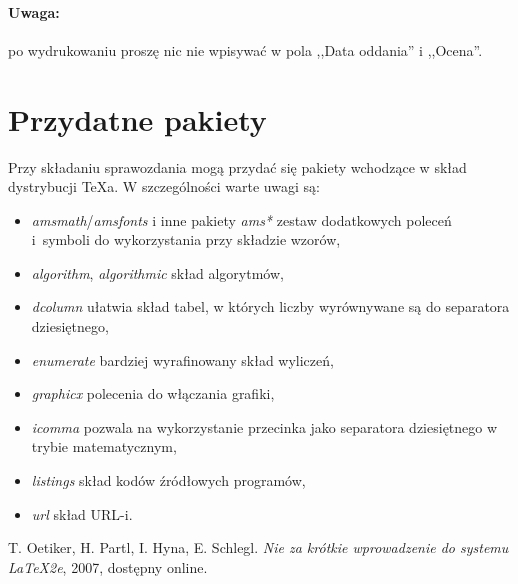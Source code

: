 \documentclass{classrep}
\begin{document}
\paragraph{Uwaga:} po wydrukowaniu proszę nic nie wpisywać w pola
,,Data oddania'' i ,,Ocena''.

\section{Przydatne pakiety}
Przy składaniu sprawozdania mogą przydać się pakiety wchodzące w
skład dystrybucji \TeX\dywiz a. W szczególności warte uwagi są:
\begin{itemize}
  \item \emph{amsmath}/\emph{amsfonts} i inne pakiety \emph{ams*} \ppauza
    zestaw dodatkowych poleceń i~symboli do wykorzystania przy składzie
    wzorów,
  \item \emph{algorithm}, \emph{algorithmic} \ppauza skład algorytmów,
  \item \emph{dcolumn} \ppauza ułatwia skład tabel, w których liczby
    wyrównywane są do separatora dziesiętnego,
  \item \emph{enumerate} \ppauza bardziej wyrafinowany skład wyliczeń,
  \item \emph{graphicx} \ppauza polecenia do włączania grafiki,
  \item \emph{icomma} \ppauza pozwala na wykorzystanie przecinka jako
    separatora dziesiętnego w trybie matematycznym,
  \item \emph{listings} \ppauza skład kodów źródłowych programów,
  \item \emph{url} \ppauza skład URL-i.
\end{itemize}

\begin{thebibliography}{0}
   T. Oetiker, H. Partl, I. Hyna, E. Schlegl.
    \textsl{Nie za krótkie wprowadzenie do systemu \LaTeX2e}, 2007, dostępny
    online.
\end{thebibliography}
\end{document}
